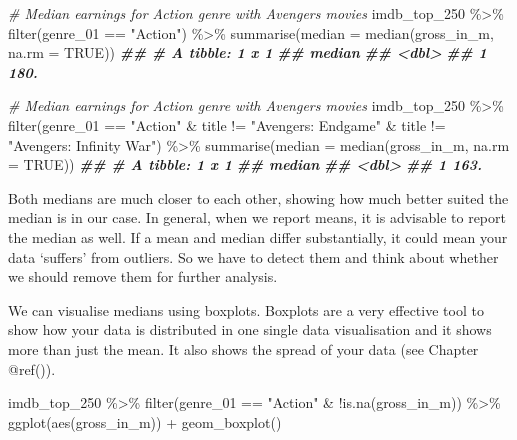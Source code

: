 \documentclass[
]{book}
\newenvironment{Shaded}{\begin{snugshade}}{\end{snugshade}}
\newcommand{\AttributeTok}[1]{\textcolor[rgb]{0.77,0.63,0.00}{#1}}
\newcommand{\CommentTok}[1]{\textcolor[rgb]{0.56,0.35,0.01}{\textit{#1}}}
\newcommand{\ConstantTok}[1]{\textcolor[rgb]{0.00,0.00,0.00}{#1}}
\newcommand{\DocumentationTok}[1]{\textcolor[rgb]{0.56,0.35,0.01}{\textbf{\textit{#1}}}}
\newcommand{\FunctionTok}[1]{\textcolor[rgb]{0.00,0.00,0.00}{#1}}
\newcommand{\NormalTok}[1]{#1}
\newcommand{\SpecialCharTok}[1]{\textcolor[rgb]{0.00,0.00,0.00}{#1}}
\newcommand{\StringTok}[1]{\textcolor[rgb]{0.31,0.60,0.02}{#1}}
\begin{document}
\begin{Shaded}
\begin{Highlighting}[]
\CommentTok{\# Median earnings for Action genre with Avengers movies}
\NormalTok{imdb\_top\_250 }\SpecialCharTok{\%\textgreater{}\%} 
  \FunctionTok{filter}\NormalTok{(genre\_01 }\SpecialCharTok{==} \StringTok{"Action"}\NormalTok{) }\SpecialCharTok{\%\textgreater{}\%} 
  \FunctionTok{summarise}\NormalTok{(}\AttributeTok{median =} \FunctionTok{median}\NormalTok{(gross\_in\_m, }\AttributeTok{na.rm =} \ConstantTok{TRUE}\NormalTok{))}
\DocumentationTok{\#\# \# A tibble: 1 x 1}
\DocumentationTok{\#\#   median}
\DocumentationTok{\#\#    \textless{}dbl\textgreater{}}
\DocumentationTok{\#\# 1   180.}

\CommentTok{\# Median earnings for Action genre with Avengers movies}
\NormalTok{imdb\_top\_250 }\SpecialCharTok{\%\textgreater{}\%} 
  \FunctionTok{filter}\NormalTok{(genre\_01 }\SpecialCharTok{==} \StringTok{"Action"} \SpecialCharTok{\&}
\NormalTok{           title }\SpecialCharTok{!=} \StringTok{"Avengers: Endgame"} \SpecialCharTok{\&}
\NormalTok{           title }\SpecialCharTok{!=} \StringTok{"Avengers: Infinity War"}\NormalTok{) }\SpecialCharTok{\%\textgreater{}\%} 
  \FunctionTok{summarise}\NormalTok{(}\AttributeTok{median =} \FunctionTok{median}\NormalTok{(gross\_in\_m, }\AttributeTok{na.rm =} \ConstantTok{TRUE}\NormalTok{))}
\DocumentationTok{\#\# \# A tibble: 1 x 1}
\DocumentationTok{\#\#   median}
\DocumentationTok{\#\#    \textless{}dbl\textgreater{}}
\DocumentationTok{\#\# 1   163.}
\end{Highlighting}
\end{Shaded}

Both medians are much closer to each other, showing how much better suited the median is in our case. In general, when we report means, it is advisable to report the median as well. If a mean and median differ substantially, it could mean your data `suffers' from outliers. So we have to detect them and think about whether we should remove them for further analysis.

We can visualise medians using boxplots. Boxplots are a very effective tool to show how your data is distributed in one single data visualisation and it shows more than just the mean. It also shows the spread of your data (see Chapter @ref()).

\begin{Shaded}
\begin{Highlighting}[]
\NormalTok{imdb\_top\_250 }\SpecialCharTok{\%\textgreater{}\%} 
  \FunctionTok{filter}\NormalTok{(genre\_01 }\SpecialCharTok{==} \StringTok{"Action"} \SpecialCharTok{\&} \SpecialCharTok{!}\FunctionTok{is.na}\NormalTok{(gross\_in\_m)) }\SpecialCharTok{\%\textgreater{}\%}
  \FunctionTok{ggplot}\NormalTok{(}\FunctionTok{aes}\NormalTok{(gross\_in\_m)) }\SpecialCharTok{+} 
  \FunctionTok{geom\_boxplot}\NormalTok{()}
\end{Highlighting}
\end{Shaded}
\end{document}
